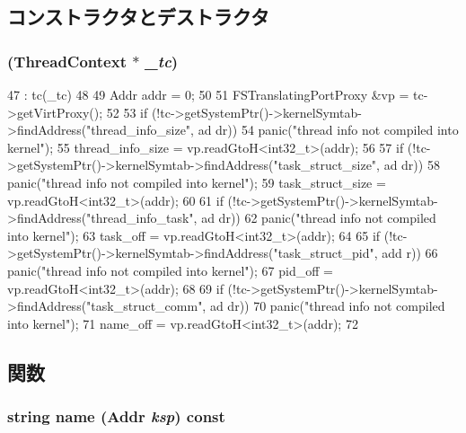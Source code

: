 \subsection{コンストラクタとデストラクタ}
\hypertarget{classX86ISA_1_1ProcessInfo_a9c31978febe8b0cc8e9e76eb6791312b}{
\subsubsection[{ProcessInfo}]{ ({\bf ThreadContext} $\ast$ {\em \_\-tc})}}
\label{classX86ISA_1_1ProcessInfo_a9c31978febe8b0cc8e9e76eb6791312b}



\begin{DoxyCode}
47         : tc(_tc)
48     {
49         Addr addr = 0;
50 
51         FSTranslatingPortProxy &vp = tc->getVirtProxy();
52 
53         if (!tc->getSystemPtr()->kernelSymtab->findAddress("thread_info_size", ad
      dr))
54             panic("thread info not compiled into kernel\n");
55         thread_info_size = vp.readGtoH<int32_t>(addr);
56 
57         if (!tc->getSystemPtr()->kernelSymtab->findAddress("task_struct_size", ad
      dr))
58             panic("thread info not compiled into kernel\n");
59         task_struct_size = vp.readGtoH<int32_t>(addr);
60 
61         if (!tc->getSystemPtr()->kernelSymtab->findAddress("thread_info_task", ad
      dr))
62             panic("thread info not compiled into kernel\n");
63         task_off = vp.readGtoH<int32_t>(addr);
64 
65         if (!tc->getSystemPtr()->kernelSymtab->findAddress("task_struct_pid", add
      r))
66             panic("thread info not compiled into kernel\n");
67         pid_off = vp.readGtoH<int32_t>(addr);
68 
69         if (!tc->getSystemPtr()->kernelSymtab->findAddress("task_struct_comm", ad
      dr))
70             panic("thread info not compiled into kernel\n");
71         name_off = vp.readGtoH<int32_t>(addr);
72     }
\end{DoxyCode}


\subsection{関数}
\hypertarget{classX86ISA_1_1ProcessInfo_ae39ec1168c2ea31862bebf2afeda34d8}{
\subsubsection[{name}]{\setlength{\rightskip}{0pt plus 5cm}string name ({\bf Addr} {\em ksp}) const}}
\label{classX86ISA_1_1ProcessInfo_ae39ec1168c2ea31862bebf2afeda34d8}



